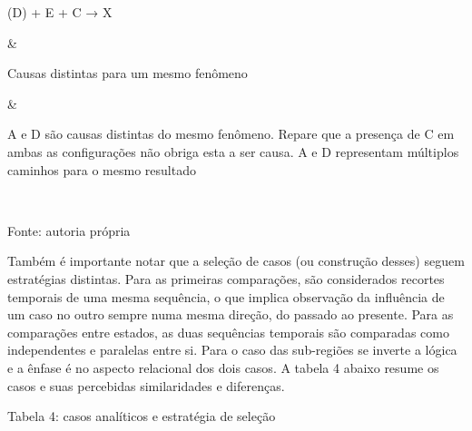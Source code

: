 \begin{longtable}[]
\begin{minipage}[b]{\linewidth}
(D) + E + C → X
\end{minipage} & \begin{minipage}[b]{\linewidth}\raggedright
Causas distintas para um mesmo fenômeno
\end{minipage} & \begin{minipage}[b]{\linewidth}\raggedright
A e D são causas distintas do mesmo fenômeno. Repare que a presença de C
em ambas as configurações não obriga esta a ser causa. A e D representam
múltiplos caminhos para o mesmo resultado
\end{minipage} \\
\midrule\noalign{}
\endhead
\bottomrule\noalign{}
\endlastfoot
\end{longtable}

Fonte: autoria própria

Também é importante notar que a seleção de casos (ou construção desses)
seguem estratégias distintas. Para as primeiras comparações, são
considerados recortes temporais de uma mesma sequência, o que implica
observação da influência de um caso no outro sempre numa mesma direção,
do passado ao presente. Para as comparações entre estados, as duas
sequências temporais são comparadas como independentes e paralelas entre
si. Para o caso das sub-regiões se inverte a lógica e a ênfase é no
aspecto relacional dos dois casos. A tabela 4 abaixo resume os casos e
suas percebidas similaridades e diferenças.

Tabela 4: casos analíticos e estratégia de seleção

